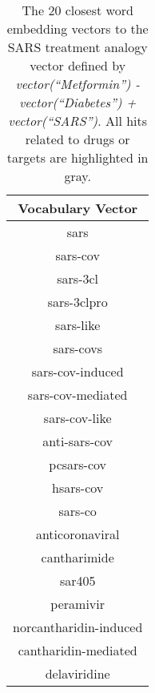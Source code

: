\documentclass{article}
\newcommand{\lgc}[1]{\cellcolor[gray]{0.85}#1}
\begin{document}
\begin{table}[ht]
\small
\centering
\caption{The 20 closest word embedding vectors to the SARS treatment analogy vector defined by \emph{vector(``Metformin'') - vector(``Diabetes'') + vector(``SARS'')}. All hits related to drugs or targets are highlighted in gray.}
\label{tab:analogy_top20}
\begin{tabular}{c}
\hline
Vocabulary Vector \\
\hline
sars \\
sars-cov \\
\lgc{sars-3cl} \\
\lgc{sars-3clpro} \\
sars-like \\
sars-covs \\
sars-cov-induced \\
sars-cov-mediated \\
sars-cov-like \\
anti-sars-cov \\
pcsars-cov \\
hsars-cov \\
sars-co \\
anticoronaviral \\
\lgc{cantharimide} \\
\lgc{sar405} \\
\lgc{peramivir} \\
norcantharidin-induced \\
cantharidin-mediated \\
\lgc{delaviridine} \\
\hline
\end{tabular}
\end{table}
\end{document}
